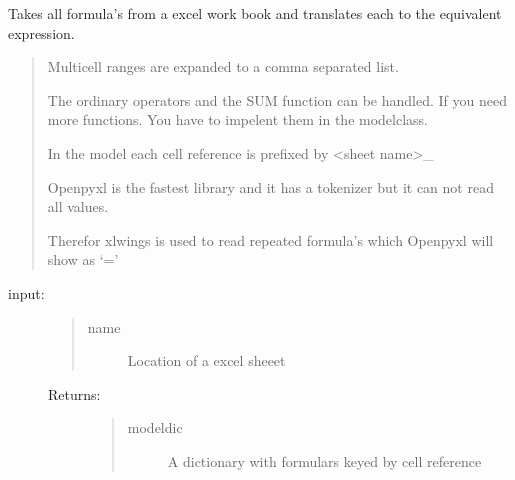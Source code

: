\documentclass[letterpaper,10pt,english]{sphinxmanual}
\begin{document}
\begin{fulllineitems}
\label{\detokenize{onboard/model_Excel:model_Excel.findequations}}
\pysigstartsignatures
{}
\pysigstopsignatures
\sphinxAtStartPar
Takes all formula’s  from a excel work book and translates each to the equivalent expression.
\begin{quote}

\sphinxAtStartPar
Multicell ranges are expanded to a comma separated list.

\sphinxAtStartPar
The ordinary operators and the SUM function can be handled. If you need more functions. You have to impelent them in the modelclass.

\sphinxAtStartPar
In the model each cell reference is prefixed by \textless{}sheet name\textgreater{}\_

\sphinxAtStartPar
Openpyxl is the fastest library and it has a tokenizer
but it can not read all values.

\sphinxAtStartPar
Therefor xlwings is used to read repeated formula’s which Openpyxl will show as ‘=’
\end{quote}
\begin{description}
\item[{input:}] \leavevmode\begin{quote}\begin{description}
\item[{name}] \leavevmode
\sphinxAtStartPar
Location of a excel sheeet

\end{description}\end{quote}
\begin{description}
\item[{Returns:}] \leavevmode\begin{quote}\begin{description}
\item[{modeldic}] \leavevmode
\sphinxAtStartPar
A dictionary with formulars keyed by cell reference

\end{description}\end{quote}

\end{description}

\end{description}

\end{fulllineitems}
\end{document}
